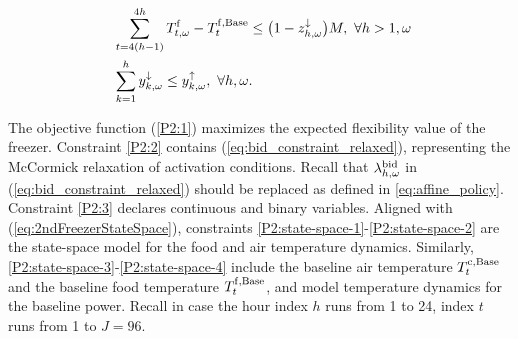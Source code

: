 {\begin{subequations}
\begin{align}
        \                                                                                             & \sum_{t=4(h-1)}^{4 h} T^{\rm{f}}_{t, \omega} - T^{\rm{f}, \rm{Base}}_{t} \leq \big(1 - z^{\downarrow}_{h, \omega}\big) M,  \  \forall{h>1,\omega} \label{rebound:4}                                                                                                                                                                                 \\
        \                                                                                             & \sum_{k=1}^{h} y^{\downarrow}_{k,\omega} \leq y^{\uparrow}_{k, \omega}, \ \forall{h, \omega}. \label{up_reg_first}  
    \end{align}
\end{subequations}

The objective function (\ref{P2:1}) maximizes the expected flexibility value of the freezer.
%
Constraint \eqref{P2:2} contains
(\ref{eq:bid_constraint_relaxed}), representing the McCormick relaxation of activation conditions. Recall that $\lambda^{\rm{bid}}_{h, \omega}$ in (\ref{eq:bid_constraint_relaxed}) should be replaced as defined in \eqref{eq:affine_policy}. Constraint \eqref{P2:3} declares continuous and binary variables. 
%
%
%
%
Aligned with (\ref{eq:2ndFreezerStateSpace}), constraints \eqref{P2:state-space-1}-\eqref{P2:state-space-2} are the state-space model for the food and air temperature dynamics. Similarly, \eqref{P2:state-space-3}-\eqref{P2:state-space-4} include the baseline air temperature $T^{\rm{c},\text{Base}}_{t}$ and the   baseline food temperature $T^{\rm{f},\text{Base}}_{t}$, and model temperature dynamics for the baseline power. %
Recall in case the hour index $h$ runs from 1 to 24, index $t$ runs from 1 to $J=96$.  
}
